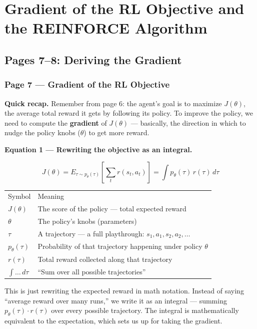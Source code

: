 \section{Gradient of the RL Objective and the REINFORCE Algorithm}

\subsection{Pages 7--8: Deriving the Gradient}

\subsubsection*{Page 7 --- Gradient of the RL Objective}

\textbf{Quick recap.}
Remember from page 6: the agent's goal is to maximize $J(\theta)$, the average total reward it
gets by following its policy. To improve the policy, we need to compute the \textbf{gradient}
of $J(\theta)$ --- basically, the direction in which to nudge the policy knobs ($\theta$) to
get more reward.

\medskip
\textbf{Equation 1 --- Rewriting the objective as an integral.}

\[
  J(\theta)
  = E_{\tau \sim p_\theta(\tau)}\!\left[\sum_t r(s_t, a_t)\right]
  = \int p_\theta(\tau)\,r(\tau)\,d\tau
\]

\begin{tabular}{ll}
  Symbol & Meaning \\[4pt]
  $J(\theta)$ & The score of the policy --- total expected reward \\
  $\theta$ & The policy's knobs (parameters) \\
  $\tau$ & A trajectory --- a full playthrough: $s_1,a_1,s_2,a_2,\ldots$ \\
  $p_\theta(\tau)$ & Probability of that trajectory happening under policy $\theta$ \\
  $r(\tau)$ & Total reward collected along that trajectory \\
  $\int\ldots\,d\tau$ & ``Sum over all possible trajectories'' \\
\end{tabular}

\medskip
This is just rewriting the expected reward in math notation. Instead of saying ``average reward
over many runs,'' we write it as an integral --- summing $p_\theta(\tau)\cdot r(\tau)$ over
every possible trajectory. The integral is mathematically equivalent to the expectation, which
sets us up for taking the gradient.

